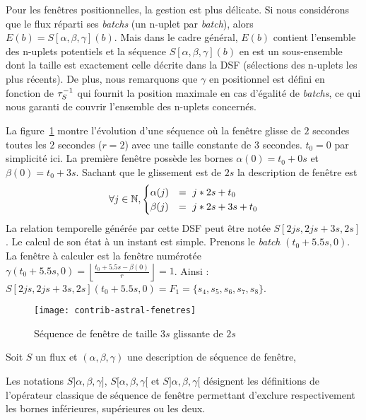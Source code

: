 Pour les fenêtres positionnelles, la gestion est plus délicate. Si nous considérons que le flux réparti ses \textit{batchs} (un n-uplet par \textit{batch}), alors $E(b) = S[\alpha,\beta,\gamma](b)$. Mais dans le cadre général, $E(b)$ contient l'ensemble des n-uplets potentiels et la séquence $S[\alpha,\beta,\gamma](b)$ en est un sous-ensemble dont la taille est exactement celle décrite dans la DSF (sélections des n-uplets les plus récents). De plus, nous remarquons que $\gamma$ en positionnel est défini en fonction de $\tau^{-1}_S$ qui fournit la position maximale en cas d'égalité de \textit{batchs}, ce qui nous garanti de couvrir l'ensemble des n-uplets concernés.


\begin{example}
	La figure~\ref{fig:contrib:astral:fenetres} montre l'évolution d'une séquence où la fenêtre glisse de $2$ secondes toutes les $2$ secondes ($r=2$) avec une taille constante de $3$ secondes. $t_0 = 0$ par simplicité ici. 
La première fenêtre possède les bornes $\alpha(0) = t_0+ 0s$ et $\beta(0) =t_0+3s$. Sachant que le glissement est de $2s$ la description de fenêtre est $$\forall j \in \N, \begin{cases} \alpha(j)  & =\ j*2s+t_0 \\ \beta(j) & = \ j*2s+3s+t_0\end{cases}$$
La relation temporelle générée par cette DSF peut être notée $S[2js,2js+3s,2s]$.  Le calcul de son état à un instant est simple. Prenons le \textit{batch} $(t_0+5.5s,0)$. La fenêtre à calculer est la fenêtre numérotée $\gamma(t_0+5.5s,0) = \left\lfloor \frac{t_0+5.5s-\beta(0)}{r}\right\rfloor = 1$. Ainsi : $S[2js,2js+3s,2s](t_0+5.5s,0) = F_1 = \{s_4,s_5,s_6,s_7,s_8\}$.
\end{example}
\begin{figure}[ht]
	\centering
	\texttt{[image: contrib-astral-fenetres]}
	\caption{Séquence de fenêtre de taille $3s$ glissante de $2s$}\label{fig:contrib:astral:fenetres}
\end{figure}

\begin{defi}\label{def:exclufenetre}
    Soit $S$ un flux et $(\alpha,\beta,\gamma)$ une description de séquence de fenêtre,

    Les notations $S]\alpha,\beta,\gamma]$, $S[\alpha,\beta,\gamma[$ et $S]\alpha,\beta,\gamma[$ désignent les définitions de l'opérateur classique de séquence de fenêtre permettant d'exclure respectivement les bornes inférieures, supérieures ou les deux.
\end{defi}

